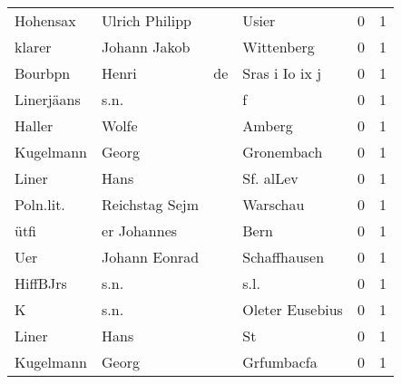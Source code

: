 \documentclass[10pt,a4paper,landscape]{article}
\begin{document}
\begin{longtable}{llllrr}
                 Hohensax &                     Ulrich Philipp &             &                                       Usier &          0 &         1 \\
                   klarer &                       Johann Jakob &             &                                  Wittenberg &          0 &         1 \\
                  Bourbpn &                              Henri &          de &                              Sras i Io ix j &          0 &         1 \\
               Linerjäans &                               s.n. &             &                                           f &          0 &         1 \\
                   Haller &                              Wolfe &             &                                      Amberg &          0 &         1 \\
                Kugelmann &                              Georg &             &                                  Gronembach &          0 &         1 \\
                    Liner &                               Hans &             &                                   Sf. alLev &          0 &         1 \\
                Poln.lit. &                     Reichstag Sejm &             &                                    Warschau &          0 &         1 \\
                     ütfi &                        er Johannes &             &                                        Bern &          0 &         1 \\
                      Uer &                      Johann Eonrad &             &                                Schaffhausen &          0 &         1 \\
                 HiffBJrs &                               s.n. &             &                                        s.l. &          0 &         1 \\
                        K &                               s.n. &             &                             Oleter Eusebius &          0 &         1 \\
                    Liner &                               Hans &             &                                          St &          0 &         1 \\
                Kugelmann &                              Georg &             &                                  Grfumbacfa &          0 &         1 \\

\end{longtable}
\end{document}

